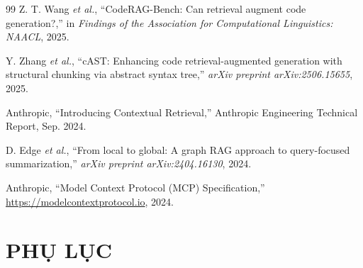 \begin{thebibliography}{99}
 Z. T. Wang \textit{et al.}, ``CodeRAG-Bench: Can retrieval augment code generation?,'' in \textit{Findings of the Association for Computational Linguistics: NAACL}, 2025.

 Y. Zhang \textit{et al.}, ``cAST: Enhancing code retrieval-augmented generation with structural chunking via abstract syntax tree,'' \textit{arXiv preprint arXiv:2506.15655}, 2025.

 Anthropic, ``Introducing Contextual Retrieval,'' Anthropic Engineering Technical Report, Sep. 2024.

 D. Edge \textit{et al.}, ``From local to global: A graph RAG approach to query-focused summarization,'' \textit{arXiv preprint arXiv:2404.16130}, 2024.

 Anthropic, ``Model Context Protocol (MCP) Specification,'' \url{https://modelcontextprotocol.io}, 2024.

\end{thebibliography}
\endgroup

\section*{PHỤ LỤC}

